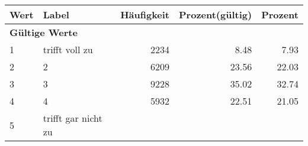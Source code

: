      \begin{longtable}{lXrrr}
     \toprule
     \textbf{Wert} & \textbf{Label} & \textbf{Häufigkeit} & \textbf{Prozent(gültig)} & \textbf{Prozent} \\
     \endhead
     \midrule
     \multicolumn{5}{l}{\textbf{Gültige Werte}}\\

     1 &
     \multicolumn{1}{X}{ trifft voll zu   } &


       \num{2234} &
       \num[round-mode=places,round-precision=2]{8.48} &
         \num[round-mode=places,round-precision=2]{7.93} \\

     2 &
     \multicolumn{1}{X}{ 2   } &


       \num{6209} &
       \num[round-mode=places,round-precision=2]{23.56} &
         \num[round-mode=places,round-precision=2]{22.03} \\

     3 &
     \multicolumn{1}{X}{ 3   } &


       \num{9228} &
       \num[round-mode=places,round-precision=2]{35.02} &
         \num[round-mode=places,round-precision=2]{32.74} \\

     4 &
     \multicolumn{1}{X}{ 4   } &


       \num{5932} &
       \num[round-mode=places,round-precision=2]{22.51} &
         \num[round-mode=places,round-precision=2]{21.05} \\

     5 &
     \multicolumn{1}{X}{ trifft gar nicht zu   } &



\end{longtable}
